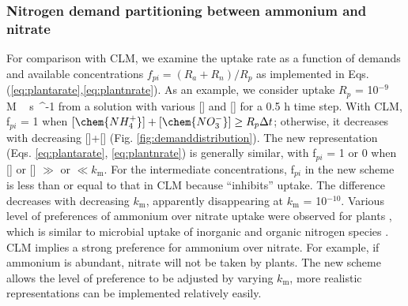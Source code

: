\documentclass[gmd, manuscript]{copernicus}
\begin{document}
\subsubsection{Nitrogen demand partitioning between ammonium and nitrate}
For comparison with CLM, we examine the uptake rate as a function of demands
and available concentrations 
$f_{pi} = ({R_a + R_n})/{R_p}$ as implemented in Eqs. (\ref{eq:plantarate},\ref{eq:plantnrate}).
As an example, we consider uptake $R_p$ = 10$^{-9}$ \unit{M\,s{^{-1}}} from a
solution with various [] and [] for a 0.5 h time
step. With CLM, f$_{pi}$ = 1 when $[\chem{NH_4^+}]+[\chem{NO_3^-}]\geq
R_p\Delta t$; otherwise, it decreases with decreasing
[]+[] (Fig. \ref{fig:demanddistribution}). The new
representation (Eqs. \ref{eq:plantarate}, \ref{eq:plantnrate}) is generally
similar, with f$_{pi}$ = 1 or 0 when [] or [] $\gg$
or $\ll k_\text{m}$. For the intermediate concentrations, f$_{pi}$ in the new
scheme is less than or equal to that in CLM because  ``inhibits''
 uptake. The difference decreases with decreasing $k_\text{m}$,
apparently disappearing at $k_\text{m}$ = 10$^{-10}$. 
Various level of preferences of ammonium over nitrate uptake were observed for plants
\citep{Pfautsch2009,Warren2007,Nordin2001,Falkengren1995,Gherardi2013}, which is similar to 
microbial uptake of inorganic and organic nitrogen species
\citep{Fouilland2007,Kirchman1994,Kirchman1998,Middelburg2000,Veuger2004}. CLM
implies a strong preference for ammonium over nitrate. For example, if
ammonium is abundant, nitrate will not be taken by plants. The new scheme
allows the level of preference to be adjusted by varying $k_\text{m}$, more
realistic representations can be implemented relatively easily. 
\end{document}
